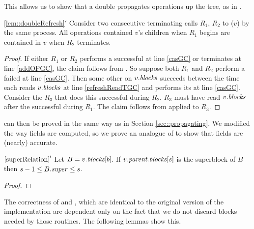 This allows us to show that a double  propagates operations up the tree, 
as in .

\begin{customlemma}{\ref{lem::doubleRefresh}$'$}\label{lem::doubleRefreshGC}
Consider two consecutive terminating calls $R_1$, $R_2$ to ($v$) by the same process.
All operations contained $v$'s children when $R_1$ begins
are contained in $v$ when $R_2$ terminates.
\end{customlemma}
\begin{proof}
If either $R_1$ or $R_2$ performs a successful  at line \ref{casGC} or terminates at line \ref{addOPGC}, the claim follows
from .
So suppose both $R_1$ and $R_2$ perform a failed  at line \ref{casGC}.
Then some other  on $v.\mbox{\textit{blocks}}$ succeeds between the time each 
reads $v.\mbox{\textit{blocks}}$ at line \ref{refreshReadTGC} and performs its  at line \ref{casGC}.
Consider the  $R_3$ that does this successful  during $R_2$.
$R_3$ must have read $v.\mbox{\textit{blocks}}$ after the successful  during $R_1$.
The claim follows from  applied to $R_3$.
\end{proof}

 can then be proved in the same way as in Section \ref{sec::propagating}.
We modified the way  fields are computed, so we prove an analogue of  to show that  fields are (nearly) accurate.

\begin{customlemma}{$\ref{superRelation}'$}\label{superRelationGC}
Let $B=v.\mbox{\textnormal{\textit{blocks}}}[b]$.
  If $v.\mbox{\textit{parent.blocks}}[s]$ is the superblock of $B$ then $s-1\leq B.\mbox{\textit{super}}\leq s$.
\end{customlemma}
\begin{proof}

\end{proof}



The correctness of  and , which are identical to the original version of the implementation are dependent only on the fact that we do not discard blocks needed by those routines.
The following lemmas show this.



